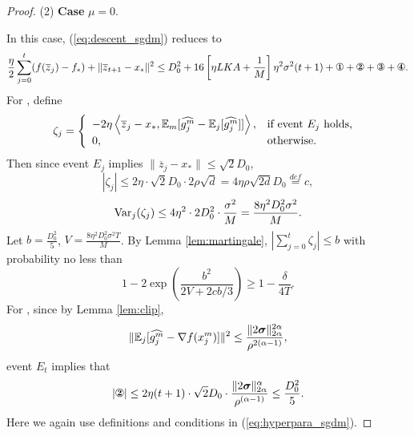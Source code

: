 \documentclass{article} %
\numberwithin{equation}{section}
\newcommand{\cirone}{\text{\ding{172}}}
\newcommand{\cirtwo}{\text{\ding{173}}}
\newcommand{\cirthree}{\text{\ding{174}}}
\newcommand{\cirfour}{\text{\ding{175}}}
\renewcommand{\eqref}[1]{(\ref{#1})}
\begin{document}
\begin{proof}
    (2) \textbf{Case} $\mu=0$.

    In this case, \eqref{eq:descent_sgdm} reduces to
    \begin{equation}
        \frac{\eta}{2}\sum_{j=0}^t(f(\overline{z}_j)-f_*)+\|\overline{z}_{t+1}-x_*\|^2
        \leq D_0^2 + 16\left[\eta LKA+\frac{1}{M}\right]\eta^2\sigma^2(t+1) + \cirone+\cirtwo+\cirthree+\cirfour.
    \end{equation}
    For \cirone, define
    \begin{equation}
        \zeta_j=\left\{
            \begin{array}{ll}
                -2\eta\left\langle\overline{z}_j-x_*, \mathbb{E}_m [\widehat{g_j^m}-\mathbb{E}_j[\widehat{g_j^m}]]\right\rangle, & \text{if event $E_j$ holds, } \\
                0 ,& \text{otherwise.}
            \end{array}
        \right.
    \end{equation}
    Then since event $E_j$ implies $\|\overline{z}_j-x_*\|\leq \sqrt{2}D_0$,
    \begin{equation}
        |\zeta_j|\leq 2\eta\cdot \sqrt{2}D_0 \cdot 2\rho\sqrt{d}=4\eta\rho\sqrt{2d}D_0\overset{def}{=}c,
    \end{equation}
    \begin{equation}
        \mathrm{Var}_j(\zeta_j) \leq 4\eta^2\cdot 2D_0^2\cdot \frac{\sigma^2}{M}=\frac{8\eta^2D_0^2\sigma^2}{M}.
    \end{equation}
    Let $b=\frac{D_0^2}{5}$, $V=\frac{8\eta^2 D_0^2\sigma^2T}{M}$.
    By Lemma \ref{lem:martingale}, $|\sum_{j=0}^t\zeta_j|\leq b$ with probability no less than
    \begin{equation}
        1-2\exp\left(\frac{b^2}{2V+2cb/3}\right)\geq 1-\frac{\delta}{4T}.
    \end{equation}
    For \cirtwo, since by Lemma \ref{lem:clip},
    \begin{equation}
        \|\mathbb{E}_j[\widehat{g_j^m}-\nabla f(x_j^m)]\|^2\leq \frac{\|2\boldsymbol{\sigma}\|_{2\alpha}^{2\alpha}}{\rho^{2(\alpha-1)}},
    \end{equation}
    event $E_t$ implies that
    \begin{equation}
        |\cirtwo|
        \leq 2\eta (t+1)\cdot \sqrt{2}D_0 \cdot\frac{\|2\boldsymbol{\sigma}\|_{2\alpha}^{\alpha}}{\rho^{(\alpha-1)}}
        \leq \frac{D_0^2}{5}.
    \end{equation}
    Here we again use definitions and conditions in \eqref{eq:hyperpara_sgdm}.
    

\end{proof}
\end{document}
